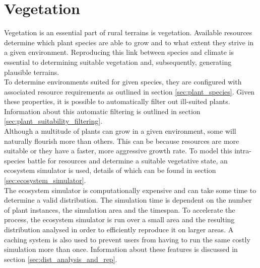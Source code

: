 \chapter{Vegetation}

Vegetation is an essential part of rural terrains is vegetation. Available resources determine which plant species are able to grow and to what extent they strive in a given environment. Reproducing this link between species and climate is essential to determining suitable vegetation and, subsequently, generating plausible terrains. \\

To determine environments suited for given species, they are configured with associated resource requirements as outlined in section \ref{sec:plant_species}. Given these properties, it is possible to automatically filter out ill-suited plants. Information about this automatic filtering is outlined in section \ref{sec:plant_suitability_filtering}.\\

Although a multitude of plants can grow in a given environment, some will naturally flourish more than others. This can be because resources are more suitable or they have a faster, more aggressive growth rate. To model this intra-species battle for resources and  determine a suitable vegetative state, an ecosystem simulator is used, details of which can be found in section \ref{sec:ecosystem_simulator}.\\

The ecosystem simulator is computationally expensive and can take some time to determine a valid distribution. The simulation time is dependent on the number of plant instances, the simulation area and the timespan. To accelerate the process, the ecosystem simulator is run over a small area and the resulting distribution analysed in order to efficiently reproduce it on larger areas. A caching system is also used to prevent users from having to run the same costly simulation more than once. Information about these features is discussed in section \ref{sec:dist_analysis_and_rep}.
